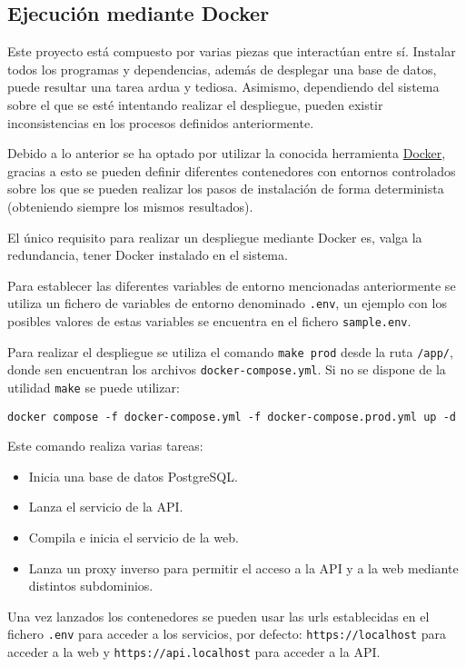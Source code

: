 \subsection{Ejecución mediante Docker}

Este proyecto está compuesto por varias piezas que interactúan entre sí.
Instalar todos los programas y dependencias, además de desplegar una base de
datos, puede resultar una tarea ardua y tediosa. Asimismo, dependiendo del
sistema sobre el que se esté intentando realizar el despliegue, pueden existir
inconsistencias en los procesos definidos anteriormente.

Debido a lo anterior se ha optado por utilizar la conocida herramienta
\href{https://www.docker.com/}{Docker}, gracias a esto se pueden definir
diferentes contenedores con entornos controlados sobre los que se pueden
realizar los pasos de instalación de forma determinista (obteniendo siempre los
mismos resultados).

El único requisito para realizar un despliegue mediante Docker es, valga la
redundancia, tener Docker instalado en el sistema.

Para establecer las diferentes variables de entorno mencionadas anteriormente se
utiliza un fichero de variables de entorno denominado \texttt{.env}, un ejemplo
con los posibles valores de estas variables se encuentra en el fichero
\texttt{sample.env}.

Para realizar el despliegue se utiliza el comando \texttt{make prod} desde la
ruta \texttt{/app/}, donde sen encuentran los archivos
\texttt{docker-compose.yml}. Si no se dispone de la utilidad \texttt{make} se
puede utilizar:

\texttt{docker compose -f docker-compose.yml -f docker-compose.prod.yml up -d}

Este comando realiza varias tareas:

\begin{itemize}
    \item Inicia una base de datos PostgreSQL.
    \item Lanza el servicio de la API.
    \item Compila e inicia el servicio de la web.
    \item Lanza un proxy inverso para permitir el acceso a la API y a la web
    mediante distintos subdominios.
\end{itemize}

Una vez lanzados los contenedores se pueden usar las urls establecidas en el
fichero \texttt{.env} para acceder a los servicios, por defecto:
\texttt{https://localhost} para acceder a la web y
\texttt{https://api.localhost} para acceder a la API.

